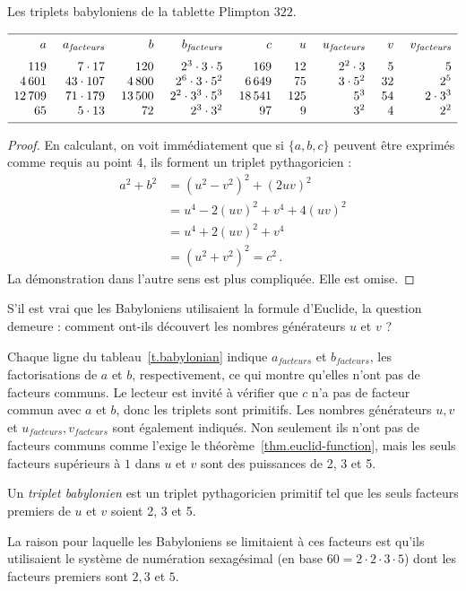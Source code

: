 \begin{table}[htbp]
\caption{Les triplets babyloniens de la tablette  Plimpton $322$.}\label{t.babylonian}
\footnotesize
\[
\begin{array}{r@{$\quad\ $}r@{$\quad\ $}r@{$\quad\ $}r@{$\quad\ $}r@{$\quad\ $}r@{$\quad\ $}r@{$\quad\ $}r@{$\quad\ $}r}
\hline
\noalign{\smallskip}
a&a_{\textit{facteurs}}&b&b_{\textit{facteurs}}&c&u&u_{\textit{facteurs}}&v&v_{\textit{facteurs}}\\
\noalign{\smallskip}\noalign{\smallskip}
119&7\cdot 17 &120&2^3 \cdot 3\cdot 5 & 169&12&2^2\cdot 3&5&5\\
4\,601 &43\cdot 107&4\,800&2^6 \cdot 3 \cdot 5^2& 6\,649&75&3\cdot 5^2&32&2^5\\
12\,709 &71\cdot 179&13\,500&2^2 \cdot 3^3 \cdot 5^3& 18\,541&125&5^3&54&2\cdot 3^3\\
65 &5\cdot 13&72&2^3 \cdot 3^2 & 97&9&3^2&4&2^2\\
\noalign{\smallskip}\hline
\end{array}\]
\end{table}

\begin{proof}
En calculant, on voit immédiatement que si $\{a,b,c\}$ peuvent être exprimés comme requis au point 4, ils forment un triplet pythagoricien :
\begin{align*}
a^2+b^2&=(u^2-v^2)^2 + (2uv)^2\\
&= u^4-2(uv)^2+v^4+4(uv)^2\\
&=u^4+2(uv)^2+v^4\\
&=(u^2+v^2)^2=c^2\,.
\end{align*}
La démonstration dans l'autre sens est plus compliquée. Elle est omise.
\end{proof}
S'il est vrai que les Babyloniens utilisaient la formule d'Euclide, la question demeure : comment ont-ils découvert les nombres générateurs $u$ et $v$ ?

Chaque ligne du tableau~\ref{t.babylonian} indique  $a_{\textit{facteurs}}$ et $b_{\textit{facteurs}}$, les factorisations de $a$ et $b$, respectivement, ce qui montre qu'elles n'ont pas de facteurs communs. Le lecteur est invité à vérifier que $c$ n'a pas de facteur commun avec $a$ et $b$,  donc les triplets sont primitifs. Les nombres générateurs $u,v$ et $u_{\textit{facteurs}}, v_{\textit{facteurs}}$ sont également indiqués. Non seulement ils n'ont pas de facteurs communs comme l'exige le théorème~\ref{thm.euclid-function}, mais les seuls facteurs supérieurs à $1$ dans $u$ et $v$ sont des puissances de 2, 3 et 5.
\begin{definition}
Un \emph{triplet babylonien} est un triplet pythagoricien primitif tel que les seuls facteurs premiers de $u$ et $v$ soient 2, 3 et 5.
\end{definition}
La raison pour laquelle les Babyloniens se limitaient à ces facteurs est qu'ils utilisaient le système de numération sexagésimal (en base $60=2\cdot 2\cdot 3\cdot 5$) dont les facteurs premiers sont $2,3$ et $5$.


